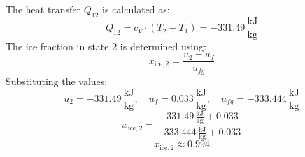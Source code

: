 The heat transfer \( Q_{12} \) is calculated as:  
\[
Q_{12} = c_V \cdot (T_2 - T_1) = -331.49 \, \frac{\text{kJ}}{\text{kg}}
\]  
The ice fraction in state 2 is determined using:  
\[
x_{\text{ice},2} = \frac{u_2 - u_f}{u_{fg}}
\]  
Substituting the values:  
\[
u_2 = -331.49 \, \frac{\text{kJ}}{\text{kg}}, \quad u_f = 0.033 \, \frac{\text{kJ}}{\text{kg}}, \quad u_{fg} = -333.444 \, \frac{\text{kJ}}{\text{kg}}
\]  
\[
x_{\text{ice},2} = \frac{-331.49 \, \frac{\text{kJ}}{\text{kg}} + 0.033}{-333.444 \, \frac{\text{kJ}}{\text{kg}} + 0.033}
\]  
\[
x_{\text{ice},2} \approx 0.994
\]